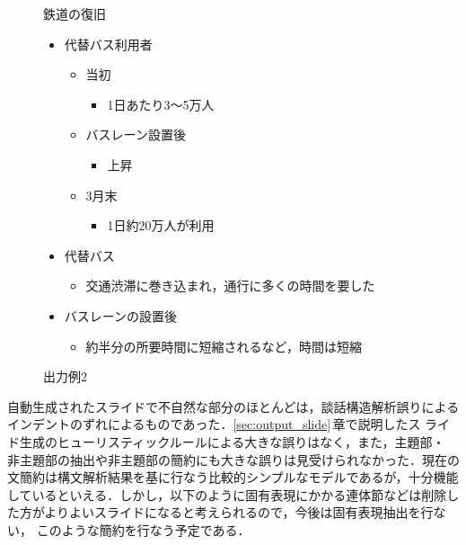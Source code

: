\begin{figure}[t]
\begin{center}
\begin{minipage}[t]{\hsize}
\begin{shadebox}
\vspace{2mm}
\begin{center}鉄道の復旧\end{center}
\begin{itemize}
 \item 代替バス利用者
  \begin{itemize}
   \item 当初
    \begin{itemize}
     \item 1日あたり3〜5万人
    \end{itemize}
   \item バスレーン設置後
    \begin{itemize}
     \item 上昇
    \end{itemize}
   \item 3月末
    \begin{itemize}
     \item 1日約20万人が利用
    \end{itemize}
  \end{itemize}
    \item 代替バス
     \begin{itemize}
      \item 交通渋滞に巻き込まれ，通行に多くの時間を要した
     \end{itemize}
    \item バスレーンの設置後
    \begin{itemize} 
      \item 約半分の所要時間に短縮されるなど，時間は短縮
     \end{itemize}
    \end{itemize}
\vspace{2mm}
\end{shadebox}
\end{minipage}
\caption{出力例2}
 \label{fig:slide_example2}
\end{center}
\end{figure}

自動生成されたスライドで不自然な部分のほとんどは，談話構造解析誤りによる
インデントのずれによるものであった．\ref{sec:output_slide}\,章で説明したス
ライド生成のヒューリスティックルールによる大きな誤りはなく，また，主題部・
非主題部の抽出や非主題部の簡約にも大きな誤りは見受けられなかった．現在の
文簡約は構文解析結果を基に行なう比較的シンプルなモデルであるが，十分機能
しているといえる．しかし，以下のように固有表現にかかる連体節などは削除し
た方がよりよいスライドになると考えられるので，今後は固有表現抽出を行ない，
このような簡約を行なう予定である．

